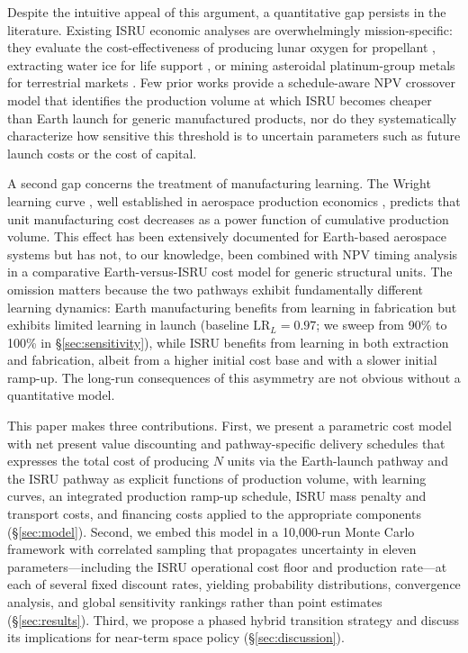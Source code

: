 \documentclass[preprint,12pt]{elsarticle}
\begin{document}
Despite the intuitive appeal of this argument, a quantitative gap persists in the literature. Existing ISRU economic analyses are overwhelmingly mission-specific: they evaluate the cost-effectiveness of producing lunar oxygen for propellant \cite{sanders2015}, extracting water ice for life support \cite{zubrin1996}, or mining asteroidal platinum-group metals for terrestrial markets \cite{sonter1997,elvis2012}. Few prior works provide a schedule-aware NPV crossover model that identifies the production volume at which ISRU becomes cheaper than Earth launch for generic manufactured products, nor do they systematically characterize how sensitive this threshold is to uncertain parameters such as future launch costs or the cost of capital.

A second gap concerns the treatment of manufacturing learning. The Wright learning curve \cite{wright1936}, well established in aerospace production economics \cite{wertz2011}, predicts that unit manufacturing cost decreases as a power function of cumulative production volume. This effect has been extensively documented for Earth-based aerospace systems \cite{argote1990,nagy2013} but has not, to our knowledge, been combined with NPV timing analysis in a comparative Earth-versus-ISRU cost model for generic structural units. The omission matters because the two pathways exhibit fundamentally different learning dynamics: Earth manufacturing benefits from learning in fabrication but exhibits limited learning in launch (baseline $\mathrm{LR}_L = 0.97$; we sweep from 90\% to 100\% in \S\ref{sec:sensitivity}), while ISRU benefits from learning in both extraction and fabrication, albeit from a higher initial cost base and with a slower initial ramp-up. The long-run consequences of this asymmetry are not obvious without a quantitative model.

This paper makes three contributions. First, we present a parametric cost model with net present value discounting and pathway-specific delivery schedules that expresses the total cost of producing $N$ units via the Earth-launch pathway and the ISRU pathway as explicit functions of production volume, with learning curves, an integrated production ramp-up schedule, ISRU mass penalty and transport costs, and financing costs applied to the appropriate components (\S\ref{sec:model}). Second, we embed this model in a 10{,}000-run Monte Carlo framework with correlated sampling that propagates uncertainty in eleven parameters---including the ISRU operational cost floor and production rate---at each of several fixed discount rates, yielding probability distributions, convergence analysis, and global sensitivity rankings rather than point estimates (\S\ref{sec:results}). Third, we propose a phased hybrid transition strategy and discuss its implications for near-term space policy (\S\ref{sec:discussion}).
\end{document}
